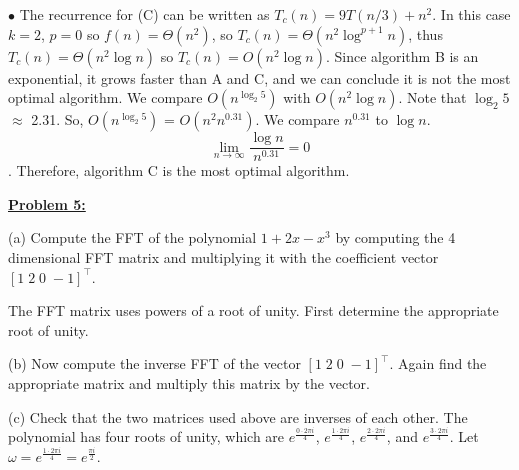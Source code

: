 \documentclass[11pt]{article}
\begin{document}
\begin{flushleft}
		$\bullet$ The recurrence for (C) can be written as $T_c(n) = 9T(n/3) + n^2$. In this case $k = 2$, $p = 0$ so $f(n) = \Theta(n^2)$, so $T_c(n) = \Theta(n^2 \log^{p + 1} n)$, thus $T_c(n) = \Theta(n^2 \log n)$ so $T_c(n) = O(n^2 \log n)$. 
		\newline
		\newline
		Since algorithm B is an exponential, it grows faster than A and C, and we can conclude it is not the most optimal algorithm. We compare $O(n^{\log_2 5})$ with $O(n^2 \log n)$. Note that $\log_2 5$ $\approx$ 2.31. So, $O(n^{\log_2 5})$ = $O(n^2n^{0.31})$. We compare $n^{0.31}$ to $\log n$. $$\lim_{n\to\infty} \frac{\log n}{n^{0.31}} = 0$$. Therefore, algorithm C is the most optimal algorithm. 
		
		\item \textbf {\underline{Problem 5:}}

		\item
		(a) Compute the FFT of the polynomial $1+2x-x^3$ by computing
		the 4 dimensional FFT matrix and multiplying it with the
		coefficient vector $[1\; 2\; 0\; -\!1]^\top$.
		
		The FFT matrix uses powers of a root of unity.
		First determine the appropriate root of unity.
		\item
		(b) Now compute the inverse FFT of the vector $[1\; 2\; 0\; -\!1]^\top$.
		Again find the appropriate matrix and multiply this matrix
		by the vector.
		\item
		(c) Check that the two matrices used above are inverses of each
		other.
		\newline\newline
		The polynomial has four roots of unity, which are $e^{\frac{0 \cdot 2\pi i}{4}}$, $e^{\frac{1 \cdot 2\pi i}{4}}$, $e^{\frac{2 \cdot 2\pi i}{4}}$, and $e^{\frac{3 \cdot 2\pi i}{4}}$. Let $\omega = e^{\frac{1 \cdot 2\pi i}{4}} = e^{\frac{\pi i}{2}}$. 
		

\end{flushleft}
\end{document}
